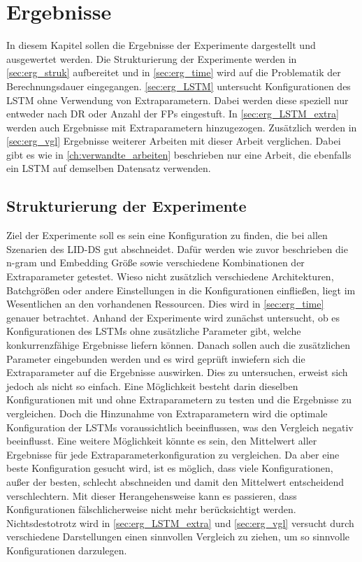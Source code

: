 \chapter{Ergebnisse}\label{ch:erg}

In diesem Kapitel sollen die Ergebnisse der Experimente dargestellt und ausgewertet werden.
Die Strukturierung der Experimente werden in \autoref{sec:erg_struk} aufbereitet und in \autoref{sec:erg_time} wird auf die Problematik der Berechnungsdauer eingegangen.
\autoref{sec:erg_LSTM} untersucht Konfigurationen des \ac{LSTM} ohne Verwendung von Extraparametern.
Dabei werden diese speziell nur entweder nach \ac{DR} oder Anzahl der \acp{FP} eingestuft.
In \autoref{sec:erg_LSTM_extra} werden auch Ergebnisse mit Extraparametern hinzugezogen.
Zusätzlich werden in \autoref{sec:erg_vgl} Ergebnisse weiterer Arbeiten mit dieser Arbeit verglichen.
Dabei gibt es wie in \autoref{ch:verwandte_arbeiten} beschrieben nur eine Arbeit, die ebenfalls ein \ac{LSTM} auf demselben Datensatz verwenden.

\section{Strukturierung der Experimente}\label{sec:erg_struk}
    Ziel der Experimente soll es sein eine Konfiguration zu finden, die bei allen Szenarien des \ac{LID-DS} gut abschneidet.
    Dafür werden wie zuvor beschrieben die n-gram und Embedding Größe sowie verschiedene Kombinationen der Extraparameter getestet. 
    Wieso nicht zusätzlich verschiedene Architekturen, Batchgrößen oder andere Einstellungen in die Konfigurationen einfließen, liegt im Wesentlichen an den vorhandenen Ressourcen.
    Dies wird in \autoref{sec:erg_time} genauer betrachtet.
    Anhand der Experimente wird zunächst untersucht, ob es Konfigurationen des \acp{LSTM} ohne zusätzliche Parameter gibt, welche konkurrenzfähige Ergebnisse liefern können.
    Danach sollen auch die zusätzlichen Parameter eingebunden werden und es wird geprüft inwiefern sich die Extraparameter auf die Ergebnisse auswirken.
    Dies zu untersuchen, erweist sich jedoch als nicht so einfach.
    Eine Möglichkeit besteht darin dieselben Konfigurationen mit und ohne Extraparametern zu testen und die Ergebnisse zu vergleichen.
    Doch die Hinzunahme von Extraparametern wird die optimale Konfiguration der \acp{LSTM} voraussichtlich beeinflussen, was den Vergleich negativ beeinflusst.
    Eine weitere Möglichkeit könnte es sein, den Mittelwert aller Ergebnisse für jede Extraparameterkonfiguration zu vergleichen.
    Da aber eine beste Konfiguration gesucht wird, ist es möglich, dass viele Konfigurationen, außer der besten, schlecht abschneiden und damit den Mittelwert entscheidend verschlechtern.
    Mit dieser Herangehensweise kann es passieren, dass Konfigurationen fälschlicherweise nicht mehr berücksichtigt werden.
    Nichtsdestotrotz wird in \autoref{sec:erg_LSTM_extra} und \autoref{sec:erg_vgl} versucht durch verschiedene Darstellungen einen sinnvollen Vergleich zu ziehen, um so sinnvolle Konfigurationen darzulegen.

